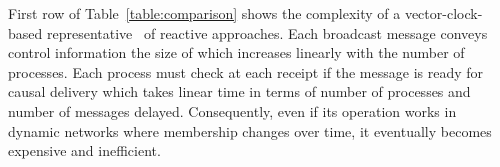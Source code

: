 

First row of Table~\ref{table:comparison} shows the complexity of a
vector-clock-based representative~\cite{schwarz1994detecting} of reactive
approaches. %
Each broadcast message conveys control information the size of which increases
linearly with the number of processes. Each process must check at each receipt
if the message is ready for causal delivery which takes linear time in terms of
number of processes and number of messages delayed. Consequently, even if its
operation works in dynamic networks where membership changes over time, it
eventually becomes expensive and inefficient.




